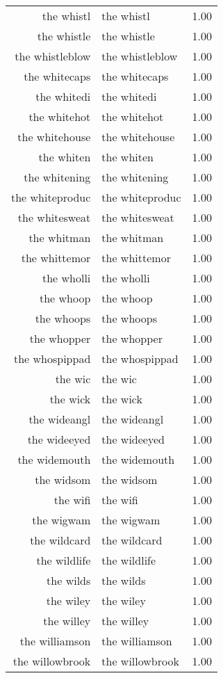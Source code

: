 \begin{table}[ht]
\begin{tabular}{rlr}
  the whistl & the whistl & 1.00 \\ 
  the whistle & the whistle & 1.00 \\ 
  the whistleblow & the whistleblow & 1.00 \\ 
  the whitecaps & the whitecaps & 1.00 \\ 
  the whitedi & the whitedi & 1.00 \\ 
  the whitehot & the whitehot & 1.00 \\ 
  the whitehouse & the whitehouse & 1.00 \\ 
  the whiten & the whiten & 1.00 \\ 
  the whitening & the whitening & 1.00 \\ 
  the whiteproduc & the whiteproduc & 1.00 \\ 
  the whitesweat & the whitesweat & 1.00 \\ 
  the whitman & the whitman & 1.00 \\ 
  the whittemor & the whittemor & 1.00 \\ 
  the wholli & the wholli & 1.00 \\ 
  the whoop & the whoop & 1.00 \\ 
  the whoops & the whoops & 1.00 \\ 
  the whopper & the whopper & 1.00 \\ 
  the whospippad & the whospippad & 1.00 \\ 
  the wic & the wic & 1.00 \\ 
  the wick & the wick & 1.00 \\ 
  the wideangl & the wideangl & 1.00 \\ 
  the wideeyed & the wideeyed & 1.00 \\ 
  the widemouth & the widemouth & 1.00 \\ 
  the widsom & the widsom & 1.00 \\ 
  the wifi & the wifi & 1.00 \\ 
  the wigwam & the wigwam & 1.00 \\ 
  the wildcard & the wildcard & 1.00 \\ 
  the wildlife & the wildlife & 1.00 \\ 
  the wilds & the wilds & 1.00 \\ 
  the wiley & the wiley & 1.00 \\ 
  the willey & the willey & 1.00 \\ 
  the williamson & the williamson & 1.00 \\ 
  the willowbrook & the willowbrook & 1.00 \\ 

\end{tabular}
\end{table}
